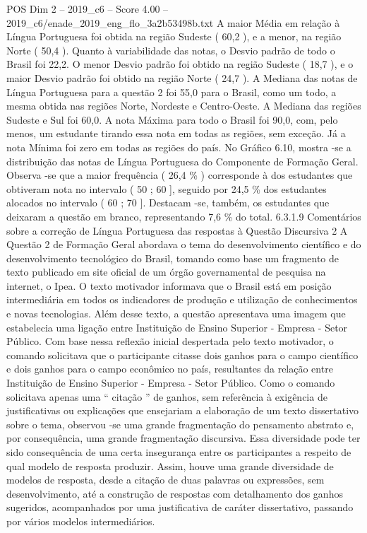 \begin{textsample}{POS Dim 2 – 2019\_c6 – Score 4.00 – 2019\_c6/enade\_2019\_eng\_flo\_3a2b53498b.txt}
A maior Média em relação à Língua Portuguesa foi obtida na região Sudeste ( 60,2 ), e a menor, na região Norte ( 50,4 ).
Quanto à variabilidade das notas, o Desvio padrão de todo o Brasil foi 22,2.
O menor Desvio padrão foi obtido na região Sudeste ( 18,7 ), e o maior Desvio padrão foi obtido na região Norte ( 24,7 ).
A Mediana das notas de Língua Portuguesa para a questão 2 foi 55,0 para o Brasil, como um todo, a mesma obtida nas regiões Norte, Nordeste e Centro-Oeste.
A Mediana das regiões Sudeste e Sul foi 60,0.
A nota Máxima para todo o Brasil foi 90,0, com, pelo menos, um estudante tirando essa nota em todas as regiões, sem exceção.
Já a nota Mínima foi zero em todas as regiões do país.
No Gráfico 6.10, mostra -se a distribuição das notas de Língua Portuguesa do Componente de Formação Geral.
Observa -se que a maior frequência ( 26,4 \% ) corresponde à dos estudantes que obtiveram nota no intervalo ( 50 ; 60 ], seguido por 24,5 \% dos estudantes alocados no intervalo ( 60 ; 70 ].
Destacam -se, também, os estudantes que deixaram a questão em branco, representando 7,6 \% do total. 6.3.1.9 Comentários sobre a correção de Língua Portuguesa das respostas à Questão Discursiva 2 A Questão 2 de Formação Geral abordava o tema do desenvolvimento científico e do desenvolvimento tecnológico do Brasil, tomando como base um fragmento de texto publicado em site oficial de um órgão governamental de pesquisa na internet, o Ipea.
O texto motivador informava que o Brasil está em posição intermediária em todos os indicadores de produção e utilização de conhecimentos e novas tecnologias.
Além desse texto, a questão apresentava uma imagem que estabelecia uma ligação entre Instituição de Ensino Superior - Empresa - Setor Público.
Com base nessa reflexão inicial despertada pelo texto motivador, o comando solicitava que o participante citasse dois ganhos para o campo científico e dois ganhos para o campo econômico no país, resultantes da relação entre Instituição de Ensino Superior - Empresa - Setor Público.
Como o comando solicitava apenas uma “ citação ” de ganhos, sem referência à exigência de justificativas ou explicações que ensejariam a elaboração de um texto dissertativo sobre o tema, observou -se uma grande fragmentação do pensamento abstrato e, por consequência, uma grande fragmentação discursiva.
Essa diversidade pode ter sido consequência de uma certa insegurança entre os participantes a respeito de qual modelo de resposta produzir.
Assim, houve uma grande diversidade de modelos de resposta, desde a citação de duas palavras ou expressões, sem desenvolvimento, até a construção de respostas com detalhamento dos ganhos sugeridos, acompanhados por uma justificativa de caráter dissertativo, passando por vários modelos intermediários.

\end{textsample}
